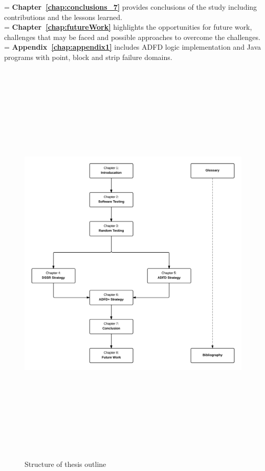 \hangindent=\parindent
{}
\noindent
\textbf{Chapter~\ref{chap:conclusions_7}} provides conclusions of the study including contributions and the lessons learned.\\

\hangindent=\parindent
{}
\noindent
\textbf{Chapter~\ref{chap:futureWork}} highlights the opportunities for future work, challenges that may be faced and possible approaches to overcome the challenges.\\


 \hangindent=\parindent
 \noindent
 \textbf{Appendix~\ref{chap:appendix1}} includes ADFD logic implementation and Java programs with point, block and strip failure domains.\\

\newpage
\begin{figure}[h]
	\centering
		\includegraphics[width=16cm, height=20cm ]{chapter1/thesisOutline.png}
		\caption{Structure of thesis outline}
	\label{fig:thesisOutline}
\end{figure}




